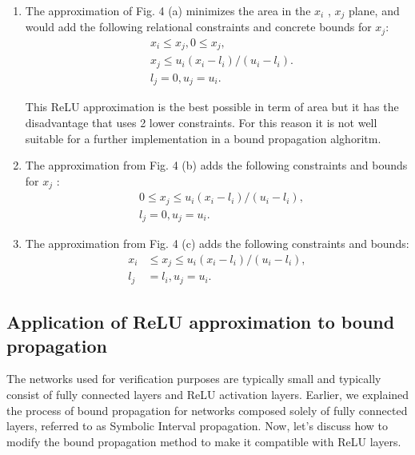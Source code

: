\begin{enumerate}
    \item The approximation of Fig. 4 (a) minimizes the area in the $x_i$ , $x_j$ plane, and would add the following relational constraints and concrete bounds for $x_j$:
       \begin{equation}
            \begin{aligned}
                & x_i \leq x_j, 0 \leq x_j, \\
                & x_j \leq u_i\left(x_i-l_i\right) /\left(u_i-l_i\right) . \\
                & l_j=0, u_j=u_i .
            \end{aligned}
        \end{equation}
        
 This ReLU approximation is the best possible in term of area but it has the disadvantage that uses 2 lower constraints. For this reason it is not well suitable for a further implementation in a bound propagation alghoritm.

    \item The approximation from Fig. 4 (b) adds the following constraints and bounds for $x_j$ :
    \begin{equation}
        \begin{aligned}
            & 0 \leq x_j \leq u_i\left(x_i-l_i\right) /\left(u_i-l_i\right), \\
            & l_j=0, u_j=u_i .
        \end{aligned}
    \end{equation}

    \item The approximation from Fig. 4 (c) adds the following constraints and bounds:
    \begin{equation}
        \begin{aligned}
            x_i & \leq x_j \leq u_i\left(x_i-l_i\right) /\left(u_i-l_i\right), \\
            l_j & =l_i, u_j=u_i .
        \end{aligned}
    \end{equation}
\end{enumerate}

\subsection{Application of ReLU approximation to bound propagation}
The networks used for verification purposes are typically small and typically consist of fully connected layers and ReLU activation layers. Earlier, we explained the process of bound propagation for networks composed solely of fully connected layers, referred to as Symbolic Interval propagation. Now, let's discuss how to modify the bound propagation method to make it compatible with ReLU layers.


